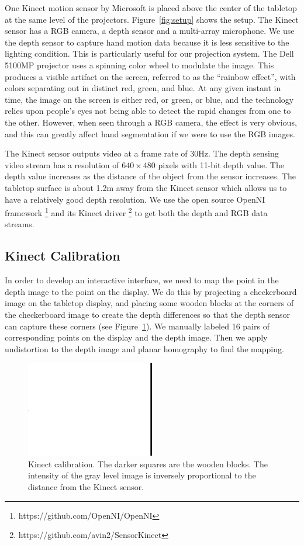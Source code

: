 One Kinect motion sensor by Microsoft is placed above the center of the tabletop
at the same level of the projectors. Figure~\ref{fig:setup} shows the setup. The
Kinect sensor has a RGB camera, a depth sensor and a multi-array microphone.
We use the depth sensor to capture hand motion data because it is
less sensitive to the lighting condition. This is particularly useful for our
projection system. The Dell 5100MP projector uses a spinning color wheel to
modulate the image. This produces a visible artifact on the screen, referred to 
as the ``rainbow effect'', with colors separating out in distinct red, green, 
and blue. At any given instant in time, the image on the screen is either red, or green, or blue,
and the technology relies upon people's eyes not being able to detect the rapid 
changes from one to the other. However, when seen through a RGB camera, the
effect is very obvious, and this can greatly affect hand segmentation if we were to use 
the RGB images. 

The Kinect sensor outputs video at a frame rate of 30Hz. The depth sensing video
stream has a resolution of $640\times 480$ pixels with 11-bit depth value. The
depth value increases as the distance of the object from the sensor increases.
The tabletop surface is about 1.2m away from the Kinect
sensor which allows us to have a relatively good depth resolution. We use the
open source OpenNI framework \footnote{https://github.com/OpenNI/OpenNI} and its
Kinect driver \footnote{https://github.com/avin2/SensorKinect} to get both the depth and RGB data streams.

\subsection{Kinect Calibration}
In order to develop an interactive interface, we need to map the point in the
depth image to the point on the display. We do this by projecting a
checkerboard image on the tabletop display, and placing some wooden blocks at
the corners of the checkerboard image to create the depth differences so that 
the depth sensor can capture these corners (see Figure~\ref{fig:calibration}).
We manually labeled 16 pairs of corresponding points on the display and the depth image. Then we
apply undistortion to the depth image and planar homography to find the mapping.

\begin{figure}[h]
  \centering
  \includegraphics[width=0.5\textwidth]{figures/calibration.png} 
  \caption{Kinect calibration. The darker squares are the wooden blocks. The
  intensity of the gray level image is inversely proportional to the distance
  from the Kinect sensor.}
  \label{fig:calibration}
\end{figure}

